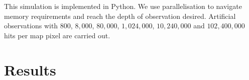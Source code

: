 \documentclass[apj]{emulateapj}
\begin{document}
This simulation is implemented in Python. We use parallelisation to navigate memory requirements and reach the depth of observation desired. Artificial observations with $800$, $8,000$, $80,000$, $1,024,000$, $10,240,000$ and $102,400,000$ hits per map pixel are carried out.







\section{Results}
\label{sec:results}
\end{document}
